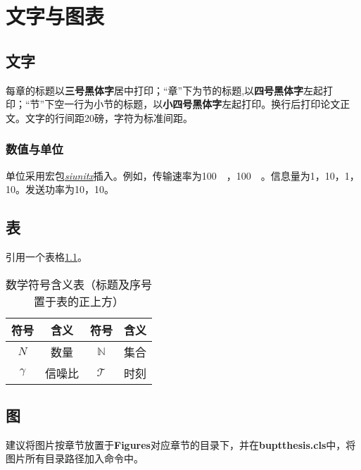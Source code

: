 \chapter{文字与图表}
\section{文字}
每章的标题以\textbf{三号黑体字}居中打印；“章”下为节的标题,以\textbf{四号黑体字}左起打印；“节”下空一行为小节的标题，以\textbf{小四号黑体字}左起打印。换行后打印论文正文。文字的行间距20磅，字符为标准间距。

\subsection{数值与单位}

单位采用宏包\href{http://mirrors.sjtug.sjtu.edu.cn/ctan/macros/latex/contrib/siunitx/siunitx.pdf}{\textit{siunitx}}插入。例如，传输速率为\SI[per-mode = symbol, per-symbol = p]{100}{\mega\bps}，\SI[per-mode = symbol, per-symbol = p]{100}{\mega\Bps}。信息量为\SI{1}{\bit}，\SI{10}{\bits}，\SI{1}{\bytefull}，\SI{10}{\bytes}。发送功率为\SI{10}{\dBm}，\SI{10}{\dBW}。

\section{表}

引用一个表格\ref{chap:notation}。

\begin{table}[!ht]
	\centering
	\caption{数学符号含义表（标题及序号置于表的正上方）}
	\label{chap:notation}
	\begin{tabular}{|c|c||c|c|}
		\hline
		\rowcolor{LightSteelBlue}
		\textbf{符号} 			& \textbf{含义} 	    & \textbf{符号}		  & \textbf{含义} 		   	 \\
		\hline
		$N$ 					 & 数量		   		 & $\mathbb{N}$ 		 & 集合 						\\
		\hline
		$\gamma$ 				 & 信噪比			    & $\mathcal{T}$ 		& 时刻		 			   \\
		\hline
	\end{tabular}
\end{table}

\section{图}

建议将图片按章节放置于\textbf{Figures}对应章节的目录下，并在\textbf{buptthesis.cls}中，将图片所有目录路径加入\latextext{\graphicspath}命令中。

